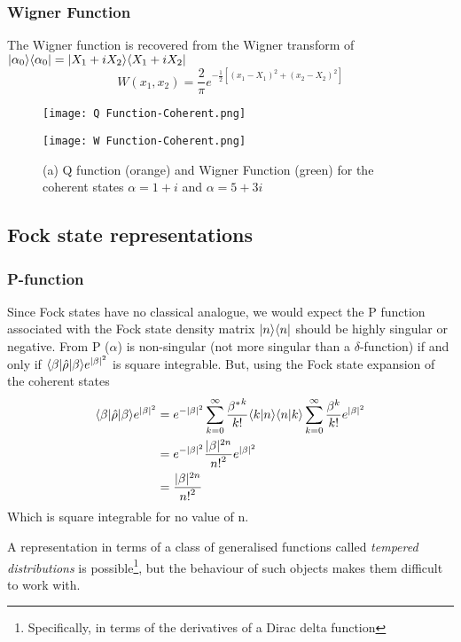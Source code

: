 \subsubsection{Wigner Function}
The Wigner function is recovered from the Wigner transform of $| \alpha_0 \rangle\langle\alpha_0 | = | X_1+iX_2 \rangle\langle X_1+iX_2 |$
\begin{equation}
	W(x_1, x_2) = \frac{2}{\pi} e^{-\frac{1}{2}[{(x_1-X_1)}^2+{(x_2-X_2)}^2]}
\end{equation}
\begin{figure}
  \begin{minipage}{0.5\linewidth}
          \texttt{[image: Q Function-Coherent.png]}
	\end{minipage}%
  \begin{minipage}{0.5\linewidth}
          \texttt{[image: W Function-Coherent.png]}
    \end{minipage}
  \caption{(a) Q function (orange) and Wigner Function (green) for the coherent states $\alpha = 1+i$ and $\alpha = 5+3i$}
\end{figure}
\subsection{Fock state representations}
\subsubsection{P-function}
Since Fock states have no classical analogue, we would expect the P function associated with the Fock state density matrix $| n \rangle\langle n |$ should be highly singular or negative.
From \cite{Mehta1967}  P ($\alpha$) is non-singular (not more singular than a $\delta$-function) if and only if $ \langle\beta | \hat{\rho} | \beta \rangle e^{|\beta|^2} $ is square integrable.
But, using the Fock state expansion of the coherent states
\begin{align}
	 \langle\beta | \hat{\rho} | \beta \rangle e^{|\beta|^2}  &= e^{-|\beta|^2} \sum_{k=0}^\infty \frac {{\beta^*}^k}{k!} \langle k | n \rangle\langle n | k \rangle \sum_{k=0}^\infty \frac {\beta^k}{k!}e^{|\beta|^2} \\ &= e^{-|\beta|^2} \frac{|\beta|^{2n}}{{n!}^2} e^{|\beta|^2} \\ &= \frac{|\beta|^{2n}}{{n!}^2}
\end{align}
Which is square integrable for no value of n.

A representation in terms of a class of generalised functions called \emph{tempered distributions} is possible\footnote{Specifically, in terms of the derivatives of a Dirac delta function\cite{Gerry2005}}, but the behaviour of such objects makes them difficult to work with.
